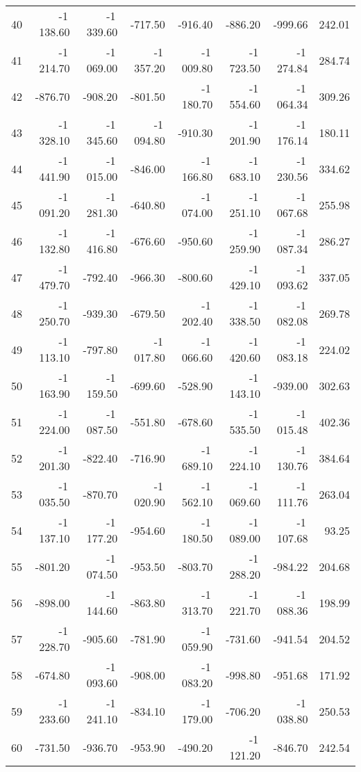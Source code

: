 \begin{longtable}{rrrrrrrr}
40 & -1\,138.60 & -1\,339.60 & -717.50 & -916.40 & -886.20 & -999.66 & 242.01  \\
41 & -1\,214.70 & -1\,069.00 & -1\,357.20 & -1\,009.80 & -1\,723.50 & -1\,274.84 & 284.74  \\
42 & -876.70 & -908.20 & -801.50 & -1\,180.70 & -1\,554.60 & -1\,064.34 & 309.26  \\
43 & -1\,328.10 & -1\,345.60 & -1\,094.80 & -910.30 & -1\,201.90 & -1\,176.14 & 180.11  \\
44 & -1\,441.90 & -1\,015.00 & -846.00 & -1\,166.80 & -1\,683.10 & -1\,230.56 & 334.62  \\
45 & -1\,091.20 & -1\,281.30 & -640.80 & -1\,074.00 & -1\,251.10 & -1\,067.68 & 255.98  \\
46 & -1\,132.80 & -1\,416.80 & -676.60 & -950.60 & -1\,259.90 & -1\,087.34 & 286.27  \\
47 & -1\,479.70 & -792.40 & -966.30 & -800.60 & -1\,429.10 & -1\,093.62 & 337.05  \\
48 & -1\,250.70 & -939.30 & -679.50 & -1\,202.40 & -1\,338.50 & -1\,082.08 & 269.78  \\
49 & -1\,113.10 & -797.80 & -1\,017.80 & -1\,066.60 & -1\,420.60 & -1\,083.18 & 224.02  \\
50 & -1\,163.90 & -1\,159.50 & -699.60 & -528.90 & -1\,143.10 & -939.00 & 302.63  \\
51 & -1\,224.00 & -1\,087.50 & -551.80 & -678.60 & -1\,535.50 & -1\,015.48 & 402.36  \\
52 & -1\,201.30 & -822.40 & -716.90 & -1\,689.10 & -1\,224.10 & -1\,130.76 & 384.64  \\
53 & -1\,035.50 & -870.70 & -1\,020.90 & -1\,562.10 & -1\,069.60 & -1\,111.76 & 263.04  \\
54 & -1\,137.10 & -1\,177.20 & -954.60 & -1\,180.50 & -1\,089.00 & -1\,107.68 & 93.25  \\
55 & -801.20 & -1\,074.50 & -953.50 & -803.70 & -1\,288.20 & -984.22 & 204.68  \\
56 & -898.00 & -1\,144.60 & -863.80 & -1\,313.70 & -1\,221.70 & -1\,088.36 & 198.99  \\
57 & -1\,228.70 & -905.60 & -781.90 & -1\,059.90 & -731.60 & -941.54 & 204.52  \\
58 & -674.80 & -1\,093.60 & -908.00 & -1\,083.20 & -998.80 & -951.68 & 171.92  \\
59 & -1\,233.60 & -1\,241.10 & -834.10 & -1\,179.00 & -706.20 & -1\,038.80 & 250.53  \\
60 & -731.50 & -936.70 & -953.90 & -490.20 & -1\,121.20 & -846.70 & 242.54  \\

\end{longtable}
